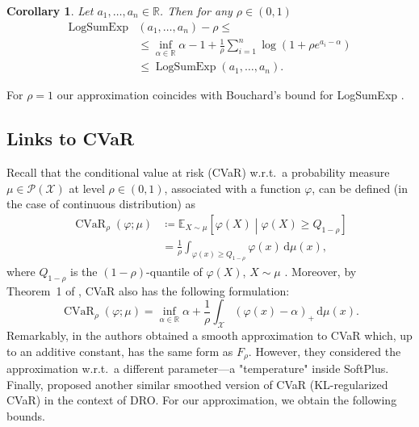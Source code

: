 \documentclass{article}
\newcommand{\dd}{\,\mathrm{d}}
\newcommand{\Pspace}{\mathcal{P}}
\newcommand{\R}{\mathbb{R}}
\newcommand{\E}{\mathbb{E}}
\newcommand*{\eqset}{\coloneqq}
\def\cX{\mathcal{X}}
\theoremstyle{plain}
\newtheorem{corollary}[theorem]{Corollary}
\theoremstyle{definition}
\theoremstyle{remark}
\begin{document}
\begin{corollary}\label{cor:logsumexp_approx}
    Let $a_1, \dots, a_n \in \R$. 
    Then for any $\rho \in (0,1)$
    \begin{align*}
        \operatorname{LogSumExp}&(a_1, \dots, a_n) - \rho \le
        \\ &\le \inf_{\alpha \in \R} \alpha - 1 + \frac{1}{\rho} \sum_{i=1}^n \log(1 + \rho e^{a_i - \alpha}) \\
        &\le \operatorname{LogSumExp}(a_1, \dots, a_n) .
    \end{align*}
    
\end{corollary}

For $\rho = 1$ our approximation coincides with Bouchard's bound for LogSumExp \citep{bouchard2007efficient}.


\subsection{Links to CVaR}

Recall that the conditional value at risk (CVaR) w.r.t.\ a probability measure $\mu \in \Pspace(\cX)$ at level $\rho \in (0,1)$, associated with a function $\varphi$, can be defined (in the case of continuous distribution) as
\begin{align*}
    \operatorname{CVaR}_\rho(\varphi; \mu) &\eqset \E_{X \sim \mu} \left[\varphi(X) \middle| \varphi(X) \ge Q_{1-\rho} \right] \\
&= \frac{1}{\rho} \int_{\varphi(x) \ge Q_{1-\rho}} \varphi(x) \dd \mu(x) ,
\end{align*}
where $Q_{1-\rho}$ is the $(1-\rho)$-quantile of $\varphi(X)$, $X \sim \mu$ \citep{rockafellar2000optimization}.
Moreover, by Theorem~1 of \citet{rockafellar2000optimization}, CVaR also has the following formulation:
\begin{equation}\label{eq:cvar_var}
    \operatorname{CVaR}_\rho(\varphi; \mu) = \inf_{\alpha \in \R} \alpha + \frac{1}{\rho} \int_{\cX} (\varphi(x) - \alpha)_+ \dd \mu(x) .
\end{equation}
Remarkably, in \cite{soma2020statistical} the authors obtained a smooth approximation to CVaR which, up to an additive constant, has the same form as $F_\rho$. However, they considered the approximation w.r.t.\ a different parameter---a "temperature" inside SoftPlus.
Finally, \citet{levy2020large} proposed another similar smoothed version of CVaR (KL-regularized CVaR) in the context of DRO.
For our approximation, we obtain the following bounds.
\end{document}
